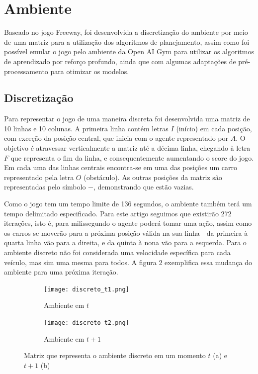\documentclass[letterpaper]{article} %
\begin{document}
\section{Ambiente}
Baseado no jogo Freeway, foi desenvolvida a discretização do ambiente por meio de uma matriz para a utilização dos algoritmos de planejamento, assim como foi possível emular o jogo pelo ambiente da Open AI Gym para utilizar os algoritmos de aprendizado por reforço profundo, ainda que com algumas adaptações de pré-processamento para otimizar os modelos.

\subsection{Discretização}
Para representar o jogo de uma maneira discreta foi desenvolvida uma matriz de 10 linhas e 10 colunas. A primeira linha contém letras $I$ (início) em cada posição, com exceção da posição central, que inicia com o agente representado por $A$. O objetivo é atravessar verticalmente a matriz até a décima linha, chegando à letra $F$ que representa o fim da linha, e consequentemente aumentando o score do jogo. Em cada uma das linhas centrais encontra-se em uma das posições um carro representado pela letra $O$ (obstáculo). As outras posições da matriz são representadas pelo símbolo $-$, demonstrando que estão vazias. 

Como o jogo tem um tempo limite de 136 segundos, o ambiente também terá um tempo delimitado especificado. Para este artigo seguimos que existirão 272 iterações, isto é, para milissegundo o agente poderá tomar uma ação, assim como os carros se moverão para a próxima posição válida na sua linha - da primeira à quarta linha vão para a direita, e da quinta à nona vão para a esquerda. Para o ambiente discreto não foi considerada uma velocidade específica para cada veículo, mas sim uma mesma para todos. A figura 2 exemplifica essa mudança do ambiente para uma próxima iteração.


\begin{figure}[h]
     \begin{subfigure}[h]{0.2\textwidth}
         \centering
         \texttt{[image: discreto\_t1.png]}
         \caption{Ambiente em $t$}
     \end{subfigure}
     \hfill
     \begin{subfigure}[h]{0.2\textwidth}
         \texttt{[image: discreto\_t2.png]}
         \caption{Ambiente em $t+1$}
     \end{subfigure}
        \caption{Matriz que representa o ambiente discreto em um momento $t$ (a) e $t+1$ (b)}
\end{figure}
\end{document}

